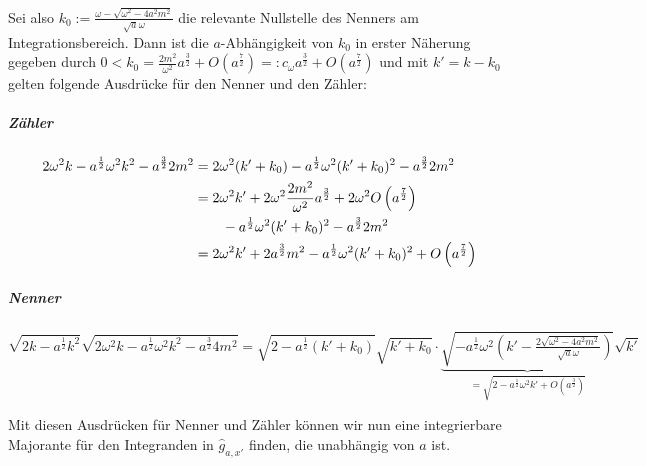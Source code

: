 Sei also $k_0 := \frac{\omega-\sqrt{\omega^2 - 4a^2m^2}}{\sqrt{a}\omega}$ die relevante Nullstelle des Nenners am Integrationsbereich.
Dann ist die $a$-Abhängigkeit von $k_0$ in erster Näherung gegeben durch $0 < k_0 = \frac{2m^2}{\omega^2}a^{\frac{3}{2}} + O\left(a^{\frac{7}{2}}\right) =: c_\omega a^{\frac{3}{2}} + O\left(a^{\frac{7}{2}}\right)$
und mit $k'=k-k_0$ gelten folgende Ausdrücke für den Nenner und den Zähler:

\subparagraph*{Zähler}

\begin{align*}
    2 \omega^2k-a^{\frac{1}{2}} \omega^2 k^2-a^{\frac{3}{2}}2m^2
    &=
    2\omega^2(k'+k_0)-a^{\frac{1}{2}}\omega^2(k'+k_0)^2-a^{\frac{3}{2}}2m^2
    \\ &=
    2 \omega^2 k' + 2 \omega^2 \frac{2m^2}{\omega^2} a^{\frac{3}{2}}
        + 2 \omega^2 O\left(a^{\frac{7}{2}}\right)
        \\  &\kern 2em-  a^{\frac{1}{2}} \omega^2(k'+k_0)^2
        -a^{\frac{3}{2}}2m^2
    \\ &=
    2 \omega^2k'+2a^{\frac{3}{2}}m^2-a^{\frac{1}{2}}\omega^2(k'+k_0)^2
        + O\left(a^{\frac{7}{2}}\right)
\end{align*}

\subparagraph*{Nenner}
\begin{dmath*}
    \sqrt{2 k-a^{\frac{1}{2}}k^2}
    \sqrt{2 \omega^2k-a^{\frac{1}{2}}\omega^2k^2-a^{\frac{3}{2}}4m^2}
    =
    \sqrt{2-a^{\frac{1}{2}}(k'+k_0)} \sqrt{k'+k_0}
    \cdot
    \underbrace{
    \sqrt{
            -a^{\frac{1}{2}}\omega^2\left(k'-\tfrac{2\sqrt{\omega^2-4a^2m^2}}
                    {\sqrt a \omega}\right)
        }
    }_{= \sqrt{2-a^{\frac{1}{2}}\omega^2 k' + O\left(a^{\frac{3}{2}}\right)}}
    \sqrt{k'}
\end{dmath*}

Mit diesen Ausdrücken für Nenner und Zähler können wir nun eine integrierbare Majorante für den Integranden in \(\hat g_{a,x'}\) finden, die unabhängig von \(a\) ist.

